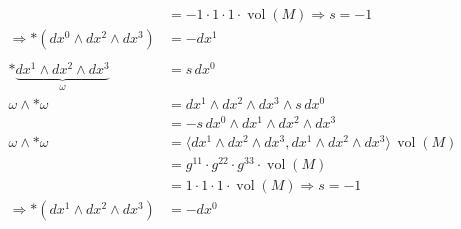 \begin{align*}
	&=
	-1 \cdot 1 \cdot 1 \cdot \operatorname{vol}(M) \Rightarrow s = -1
	\\
	\Rightarrow \ast (dx^0 \wedge dx^2 \wedge dx^3) 
	&= - dx^1
\\
\\
	\ast \underbrace{dx^1 \wedge dx^2 \wedge dx^3}_{\omega}
	&=
	s \, dx^0
	\\
	\omega \wedge \ast \omega 
	&=
	dx^1 \wedge dx^2 \wedge dx^3 \wedge s \, dx^0
	\\
	&=
	-s \, dx^0 \wedge dx^1 \wedge dx^2 \wedge dx^3
	\\
	\omega \wedge \ast \omega
	&=
	\langle dx^1 \wedge dx^2 \wedge dx^3 , dx^1 \wedge dx^2 \wedge dx^3 \rangle \, \operatorname{vol}(M)
	\\
	&=
	g^{11} \cdot g^{22} \cdot g^{33} \cdot \operatorname{vol}(M)
	\\
	&=
	1 \cdot 1 \cdot 1 \cdot \operatorname{vol}(M) \Rightarrow s = -1
	\\
	\Rightarrow \ast (dx^1 \wedge dx^2 \wedge dx^3) 
	&= - dx^0
\end{align*}



